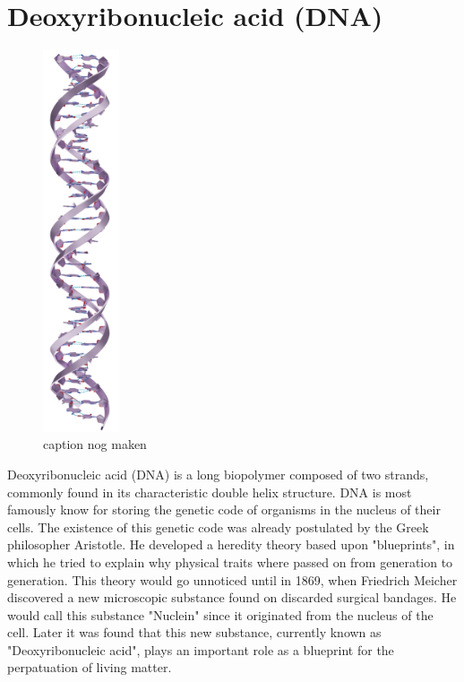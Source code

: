 \section{Deoxyribonucleic acid (DNA)}

\begin{figure}
  \begin{center}
    \includegraphics[width=0.2\textwidth]{Figures/DNAStrand.png}
  \end{center}
  \caption{caption nog maken}
\end{figure}

Deoxyribonucleic acid (DNA) is a long biopolymer composed of two strands, commonly found
in its characteristic double helix structure. DNA is most famously know for storing the
genetic code of organisms in the nucleus of their cells. The existence of this genetic
code was already
postulated by the Greek philosopher Aristotle. He developed a heredity theory based
upon "blueprints", in which he tried to explain why physical traits where passed on from
generation to generation. This theory would go unnoticed until in 1869, when
Friedrich Meicher discovered a new microscopic substance found on discarded
surgical bandages.\cite{Miescher1871} He would call this substance "Nuclein" since it
originated from the nucleus of the cell. Later it was found that this new substance,
currently known as "Deoxyribonucleic acid", plays an important role as a blueprint for
the perpatuation of living matter.\cite{Avery1944}


